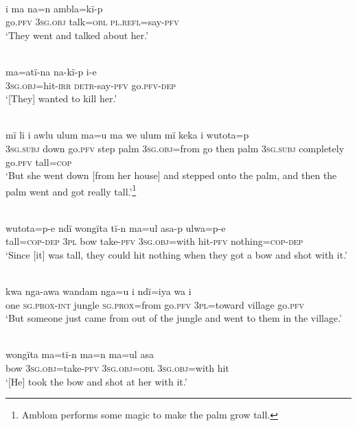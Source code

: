 \\
\gll i    ma      na=n    ambla=kï-p\\
go.\textsc{pfv}  3\textsc{sg.obj}  talk=\textsc{obl}  \textsc{pl.refl}=say-\textsc{pfv}\\
\glt ‘They went and talked about her.’

\\
\gll ma=atï-na      na-kï-p      i-e\\
3\textsc{sg.obj}=hit-\textsc{irr}  \textsc{detr-}say-\textsc{pfv}  go.\textsc{pfv-dep}\\
\glt ‘[They] wanted to kill her.’

\\
\gll mï      li    i    awlu  ulum  ma=u       ma  we    ulum mï      keka      i     wutota=p\\
3\textsc{sg.subj}  down  go.\textsc{pfv}  step  palm  3\textsc{sg.obj=}from  go  then  palm 3\textsc{sg.subj}  completely  go.\textsc{pfv}  tall=\textsc{cop}\\
\glt ‘But she went down [from her house] and stepped onto the palm, and then the palm went and got really tall.’\footnote{Amblom performs some magic to make the palm grow tall.}

\\
\gll wutota=p-e  ndï  wongïta  tï-n      ma=ul      asa-p ulwa=p-e\\
tall=\textsc{cop}{}-\textsc{dep}  3\textsc{pl}  bow    take-\textsc{pfv}  3\textsc{sg.obj}=with  hit-\textsc{pfv} nothing=\textsc{cop}{}-\textsc{dep}\\
\glt ‘Since [it] was tall, they could hit nothing when they got a bow and shot with it.’

\\
\gll kwa  nga-awa    wandam  nga=u        i    ndï=iya wa    i\\
one    \textsc{sg.prox-int}  jungle    \textsc{sg.prox=}from  go.\textsc{pfv}  3\textsc{pl}=toward village  go.\textsc{pfv}\\
\glt ‘But someone just came from out of the jungle and went to them in the village.’

\\
\gll wongïta  ma=tï-n      ma=n      ma=ul      asa\\
bow    3\textsc{sg.obj}=take-\textsc{pfv}  3\textsc{sg.obj=obl}  3\textsc{sg.obj}=with  hit\\
\glt ‘[He] took the bow and shot at her with it.’

